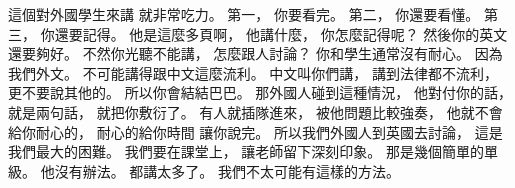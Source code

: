 \hypertarget{w01:cue:2920}{}這個對外國學生來講
\hypertarget{w01:cue:2921}{}就非常吃力。
\hypertarget{w01:cue:2922}{}第一，
\hypertarget{w01:cue:2923}{}你要看完。
\hypertarget{w01:cue:2924}{}第二，
\hypertarget{w01:cue:2925}{}你還要看懂。
\hypertarget{w01:cue:2926}{}第三，
\hypertarget{w01:cue:2927}{}你還要記得。
\hypertarget{w01:cue:2928}{}他是這麼多頁啊，
\hypertarget{w01:cue:2929}{}他講什麼，
\hypertarget{w01:cue:2930}{}你怎麼記得呢？
\hypertarget{w01:cue:2931}{}然後你的英文還要夠好。
\hypertarget{w01:cue:2932}{}不然你光聽不能講，
\hypertarget{w01:cue:2933}{}怎麼跟人討論？
\hypertarget{w01:cue:2934}{}你和學生通常沒有耐心。
\hypertarget{w01:cue:2935}{}因為我們外文。
\hypertarget{w01:cue:2936}{}不可能講得跟中文這麼流利。
\hypertarget{w01:cue:2937}{}中文叫你們講，
\hypertarget{w01:cue:2938}{}講到法律都不流利，
\hypertarget{w01:cue:2939}{}更不要說其他的。
\hypertarget{w01:cue:2940}{}所以你會結結巴巴。
\hypertarget{w01:cue:2941}{}那外國人碰到這種情況，
\hypertarget{w01:cue:2942}{}他對付你的話，
\hypertarget{w01:cue:2943}{}就是兩句話，
\hypertarget{w01:cue:2944}{}就把你敷衍了。
\hypertarget{w01:cue:2945}{}有人就插隊進來，
\hypertarget{w01:cue:2946}{}被他問題比較強奏，
\hypertarget{w01:cue:2947}{}他就不會給你耐心的，
\hypertarget{w01:cue:2948}{}耐心的給你時間
\hypertarget{w01:cue:2949}{}讓你說完。
\hypertarget{w01:cue:2950}{}所以我們外國人到英國去討論，
\hypertarget{w01:cue:2951}{}這是我們最大的困難。
\hypertarget{w01:cue:2952}{}我們要在課堂上，
\hypertarget{w01:cue:2953}{}讓老師留下深刻印象。
\hypertarget{w01:cue:2954}{}那是幾個簡單的單級。
\hypertarget{w01:cue:2955}{}他沒有辦法。
\hypertarget{w01:cue:2956}{}都講太多了。
\hypertarget{w01:cue:2957}{}我們不太可能有這樣的方法。

